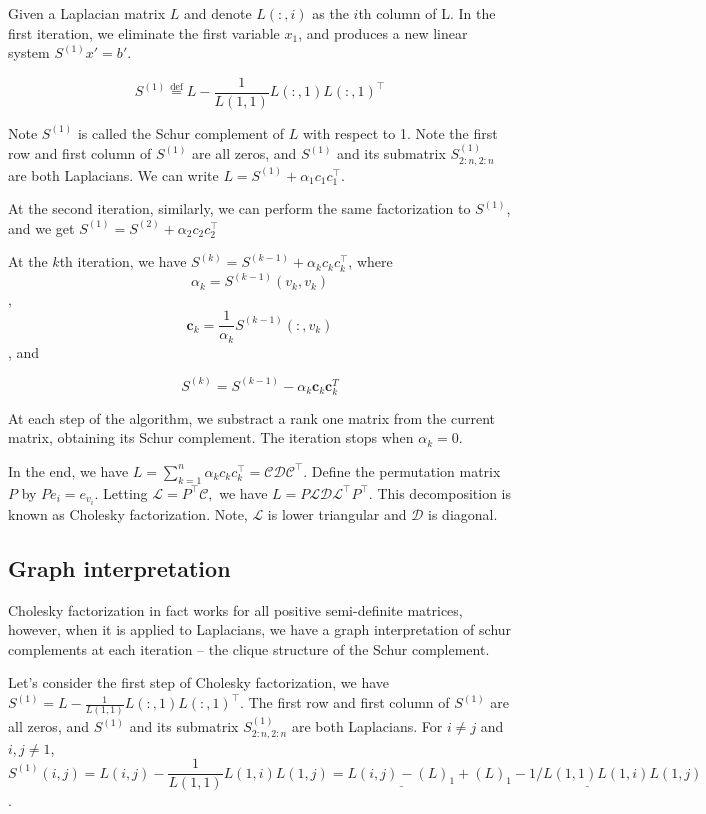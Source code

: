 \documentclass[11pt]{article}
\newcommand\ee{\boldsymbol{\mathit{e}}}
\def\defeq{\stackrel{\mathrm{def}}{=}}
\begin{document}
Given a Laplacian matrix $L$ and denote $L(:,i)$ as the $i$th column of L. In the first iteration, we eliminate the first variable $x_1$, and produces a new linear system $S^{(1)} x' = b'$.

$$ S^{(1)} \defeq L - \frac{1}{L(1,1)}L(:,1) L(:,1)^{\top} $$

Note $S^{(1)}$ is called the Schur complement of $L$ with respect to 1. Note the first row and first column of $S^{(1)}$ are all zeros, and $S^{(1)}$ and its submatrix $S^{(1)}_{2:n,2:n}$ are both Laplacians. We can write $L = S^{(1)} + \alpha_1 c_1 c_1^\top$.

At the second iteration, similarly, we can perform the same factorization to $S^{(1)}$, and we get $S^{(1)} = S^{(2)} + \alpha_2 c_2 c_2^\top$ 

At the $k$th iteration, we have $S^{(k)} = S^{(k-1)} + \alpha_k c_k c_k^\top$, where $$\alpha_k = S^{(k-1)}(v_k,v_k)$$, 
$$\bm{c}_k=\frac{1}{\alpha_k}S^{(k-1)}(:,v_k)$$, and 

$$S^{(k)} =S^{(k-1)}-\alpha_k\bm{c}_k\bm{c}_k^{T}$$

At each step of the algorithm, we substract 
a rank one matrix from the current matrix, obtaining its Schur complement. The iteration stops when $\alpha_k = 0$. 

In the end, we have $L = \sum_{k=1}^n \alpha_k c_k c_k^\top = \mathcal{C} \mathcal{D} \mathcal{C}^{\top}$. Define the permutation matrix $P$ by $P \ee_{i} = \ee_{v_{i}}.$
Letting $\mathcal{L} = P^{\top}\mathcal{C},$ we have
$L = 
 P \mathcal{L} \mathcal{D} \mathcal{L}^{\top} P^{\top}.$
This decomposition is known as Cholesky factorization.
Note, $\mathcal{L}$ is lower triangular and $\mathcal{D}$ is diagonal.



\subsection{Graph interpretation}
Cholesky factorization in fact works for all positive semi-definite matrices, however, when it is applied to Laplacians, we have a graph interpretation of schur complements at each iteration -- the clique structure of the Schur complement. 

Let's consider the first step of Cholesky factorization, we have $ S^{(1)} = L - \frac{1}{L(1,1)}L(:,1) L(:,1)^{\top} $. The first row and first column of $S^{(1)}$ are all zeros, and $S^{(1)}$ and its submatrix $S^{(1)}_{2:n,2:n}$ are both Laplacians. For $i \neq j$ and $i,j \neq 1$, $$S^{(1)}(i, j) = L(i,j) - \frac{1}{L(1,1)} L(1,i)L(1,j) = \underline{L(i,j) - (L)_1} + \underline{(L)_1 - 1/L(1,1) L(1,i)L(1,j)}$$.  
\end{document}

